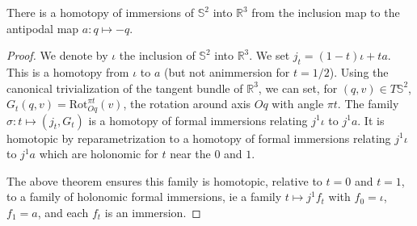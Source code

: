 \begin{theorem}[Smale 1958]
  \label{thm:sphere_eversion}
	There is a homotopy of immersions of $𝕊^2$ into $ℝ^3$ from the inclusion map to
	the antipodal map $a : q ↦ -q$.
\end{theorem}

\begin{proof}
	We denote by $ι$ the inclusion of $𝕊^2$ into $ℝ^3$.
	We set $j_t = (1-t)ι	+ ta$.
  This is a homotopy from $ι$ to $a$ (but not animmersion for $t=1/2$).
  Using the canonical trivialization of the tangent
	bundle of $ℝ^3$, we can set, for $(q, v) ∈ T𝕊^2$,
	$G_t(q, v) = \mathrm{Rot}_{Oq}^{πt}(v)$, the rotation around axis $Oq$ with
	angle $πt$.
  The family $σ : t ↦ (j_t, G_t)$ is a homotopy of formal immersions
  relating $j^1ι$ to $j^1a$.
  It is homotopic by reparametrization to a homotopy of formal immersions
  relating $j^1ι$ to $j^1a$ which are holonomic for $t$ near the
  $0$ and $1$.

  The above theorem ensures this family is homotopic,
	relative to $t = 0$ and $t = 1$, to a family of holonomic formal immersions,
	ie a family $t ↦ j^1f_t$ with $f_0 = ι$, $f_1 = a$, and each $f_t$ is an
	immersion.
\end{proof}

